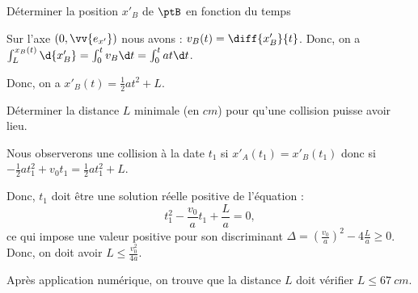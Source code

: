 


\begin{enonce}
	Déterminer la position $x'_B$ de $\ptB$ en fonction du temps	
\end{enonce}


\begin{corrige}
	Sur l'axe $(0,\vv{e_{x'}})$ nous avons : $v_B(t) = 
	\diff{x'_B}{t} $. Donc, on a
	$\int^{x_B(t)}_{L}	\d {x'_B}=\int^t_0 v_B  \d t=\int^t_0 at  \d t$.
	
		Donc, 
	on a  $x'_B(t)=\frac{1}{2}at^2+L$.
\end{corrige}




\begin{enonce}
	Déterminer la distance $L$ minimale (en $\si{cm}$) pour qu'une collision puisse avoir lieu.
	
\end{enonce}


\begin{corrige}
	Nous observerons une collision à la date $t_1$ si $x'_A(t_1)=x'_B(t_1)$ donc si
	$-\frac{1}{2}at_1^2+v_0t_1=\frac{1}{2}at_1^2+L$.
	
	Donc, $t_1$ doit être une solution réelle positive de l'équation : 
	\[
	t_1^2-\frac{v_0}{a}t_1+\frac{L}{a}=0,
	\]
	ce qui impose une valeur positive pour son discriminant $\Delta= \left(\frac{v_0}{a}\right)^2-4\frac{L}{a} \geq 0$. Donc, on doit avoir $L \leq \frac{v_0^2}{4a}$.
	
	Après application numérique, on trouve que la distance $L$ doit vérifier $L\leq \SI{67}{cm}$.
\end{corrige}


\finEntrainement






